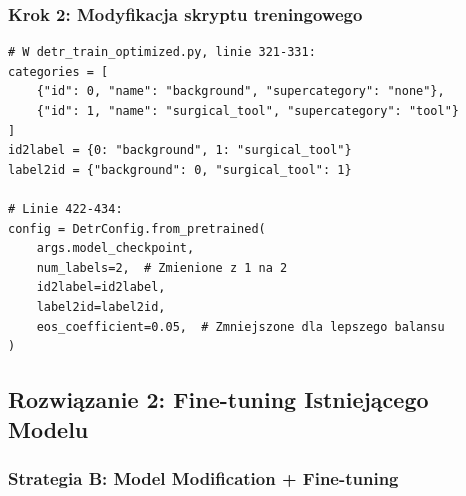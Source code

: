 \documentclass[12pt,a4paper]{article}
\begin{document}
\subsubsection{Krok 2: Modyfikacja skryptu treningowego}

\begin{lstlisting}[caption={Modyfikacja kategorii w skrypcie treningowym},label={lst:training_mod}]
# W detr_train_optimized.py, linie 321-331:
categories = [
    {"id": 0, "name": "background", "supercategory": "none"},
    {"id": 1, "name": "surgical_tool", "supercategory": "tool"}
]
id2label = {0: "background", 1: "surgical_tool"}
label2id = {"background": 0, "surgical_tool": 1}

# Linie 422-434:
config = DetrConfig.from_pretrained(
    args.model_checkpoint,
    num_labels=2,  # Zmienione z 1 na 2
    id2label=id2label,
    label2id=label2id,
    eos_coefficient=0.05,  # Zmniejszone dla lepszego balansu
)
\end{lstlisting}

\subsection{Rozwiązanie 2: Fine-tuning Istniejącego Modelu}

\subsubsection{Strategia B: Model Modification + Fine-tuning}
\end{document}
